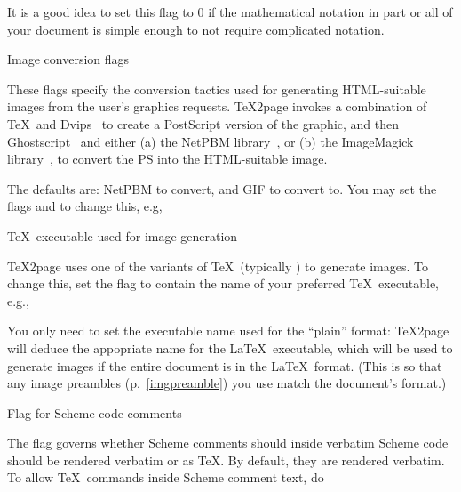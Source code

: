 It is a good idea to set this flag to 0 if the
mathematical notation in part or all of your document is simple enough to
not require complicated notation.

\beginsection Image conversion flags

%
These flags specify the conversion tactics used
for generating HTML-suitable images from the user's graphics
requests.  \TeX2page invokes a combination of \TeX\ and
Dvips~\cite{dvips} to create a PostScript version of the
graphic, and then Ghostscript~\cite{gs} and either (a) the
NetPBM library~\cite{netpbm}, or (b) the ImageMagick
library~\cite{imagemagick}, to convert the PS into the
HTML-suitable image.

The defaults are: NetPBM
to convert, and GIF to convert to.
You may set the flags \p{\TZPimageconverter} and \p{\TZPimageformat} to
change this, e.g,


\beginsection \TeX\ executable used for image generation

\TeX2page uses one of the variants of \TeX\ (typically ) to
generate images. To change this, set the flag \p{\TZPtexprogname} to
contain the name of your preferred \TeX\ executable, e.g.,


You only need to set the executable name used for the ``plain'' format:
\TeX2page will deduce the appopriate name for the \LaTeX\ executable,
which will be used to generate images if the entire document is in the
\LaTeX\ format.  (This is so that any image preambles
(p.~\ref{imgpreamble}) you use match the
document's format.)

\beginsection Flag for Scheme code comments

The flag \p{\TZPslatexcomments} governs whether Scheme comments
should inside verbatim Scheme code should be rendered verbatim or as \TeX.
By default, they are rendered verbatim.   To allow \TeX\ commands inside
Scheme comment text, do

